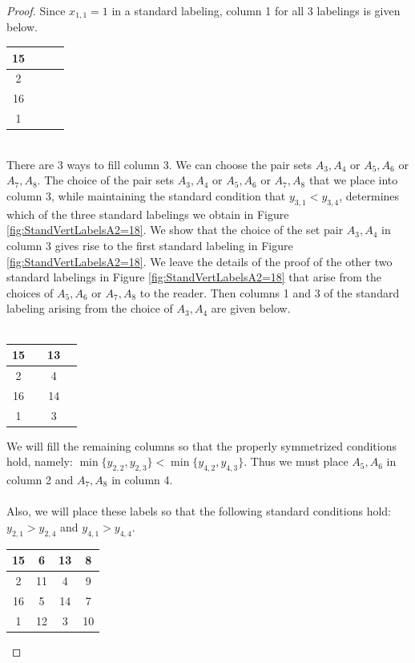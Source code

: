 \documentclass[10pt, reqno]{amsart}
\theoremstyle{definition}
\theoremstyle{plain}
\begin{document}
\begin{proof}
Since $x_{1,1}=1$ in a standard labeling, column 1 for all 3 labelings is given below. 
\begin{center}
\begin{tabular}{|c|c|c|c|} \hline
       15  &  &  &  \\  \hline
        2  &  &   &  \\  \hline
       16  &   &  & \\  \hline
        1  &  &   &  \\  \hline
    \end{tabular}
    \end{center}
\hspace{2in}\\
There are 3 ways to fill column 3. We can choose the pair sets $A_3, A_4$ or $A_5, A_6$ or $A_7, A_8$. 
The choice of the pair sets $A_3, A_4$ or $A_5, A_6$ or $A_7, A_8$
that we place into column 3, while maintaining the standard condition that $y_{3,1}<y_{3,4}$,
determines which of the three standard labelings we obtain in Figure \ref{fig:StandVertLabelsA2=18}.
We show that the choice of the set pair $A_3, A_4$ in column 3 gives rise to the first
standard labeling in Figure \ref{fig:StandVertLabelsA2=18}.
We leave the details of the proof of the other two standard
labelings in Figure \ref{fig:StandVertLabelsA2=18} that arise from the choices of $A_5, A_6$ or $A_7, A_8$ to the reader.
Then columns 1 and 3 of the standard labeling arising from the choice of $A_3, A_4$ are given below.\\
\hspace{2in}\\
\begin{center}
\begin{tabular}{|c|c|c|c|} \hline
       15  &  & 13 &  \\  \hline
        2  &  & 4  &   \\  \hline
       16  &   & 14 & \\  \hline
        1  &  & 3  &  \\  \hline
    \end{tabular}
\end{center}
    We will fill the remaining columns so that the properly symmetrized conditions hold, namely:
$\min\big\{y_{2,2}, y_{2,3} \big\}<\min\big\{y_{4,2}, y_{4,3} \big\}$. Thus we must place $A_5, A_6$ in column 2 and $A_7, A_8$ in column 4.\\
\hspace{2in}\\
Also, we will place these labels so that the following standard conditions hold: $y_{2,1}>y_{2,4}$ and $y_{4,1}>y_{4,4}$.
\hspace{2in}\\
\begin{center}
\begin{tabular}{|c|c|c|c|} \hline
       15  & 6 & 13 & 8 \\  \hline
        2  & 11 & 4  & 9 \\  \hline
       16  & 5 & 14 & 7\\  \hline
        1  & 12 & 3  &  10\\  \hline
    \end{tabular}
    \end{center}


\end{proof}
\end{document}

